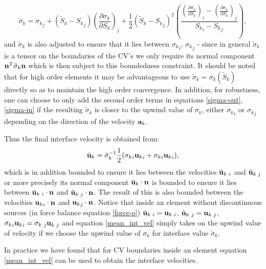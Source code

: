 \begin{equation}
\tilde\sigma_k =  {\sigma_k}_j + (\tilde S_k - {S_k}_j) \left(\frac{\partial\sigma_k}{\partial S_k}\right)_j 
+\frac{1}{2} (\tilde S_k - {S_k}_j)^2   
\left(  \frac{  \left(\frac{\partial\sigma_k}{\partial S_k}\right)_i - \left(\frac{\partial\sigma_k}{\partial S_k}\right)_j  }  
{{S_k}_i - {S_k}_j} \right), 
\label{sigma-in}
\end{equation} 
and $\tilde\sigma_k$ is also adjusted to ensure that it lies between ${\sigma_k}_i$, ${\sigma_k}_j$ - since 
in general $\tilde\sigma_k$ is a tensor on the boundaries of the CV's we only require its 
normal component ${\bf n}^T\tilde\sigma_k {\bf n}$ which is then subject to this boundedness constraint. 
It should be noted that for high order elements it may be advantageous to use $\tilde\sigma_k = \sigma_k (\tilde S_k)$ 
directly so as to maintain the high order convergence. In addition, for robustness, one can 
choose to only add the second order terms in equations  \ref{sigma-out}, \ref{sigma-in} if the resulting 
$\tilde\sigma_k $ is closer to the upwind value of $\sigma_k$, either ${\sigma_k}_i$ or ${\sigma_k}_j$ 
depending on the direction of the velocity ${\bf a}_k$. 

Thus the final interface velocity is obtained from:
\begin{equation}
{\tilde{\bf u}_k} = {\tilde\sigma_k}^{-1}  \frac{1}{2} ( {\sigma_k}_i {{\bf u}_k}_i + {\sigma_k}_i {{\bf u}_k}_i ), 
\label{mean_int_vel}  
\end{equation} 
which is in addition bounded to ensure it lies between the velocities ${\tilde{\bf u}_k}\:_i$ and ${\tilde{\bf u}_k}\:_j$ 
or more precisely its normal component ${\tilde{\bf u}_k}\cdot {\bf n}$ is bounded to ensure it lies between 
${\tilde{\bf u}_k}\:_i\cdot {\bf n}$ and ${\tilde{\bf{u}}_k}\:_j\cdot {\bf n}$. 
The result of this is also bounded between the velocities 
${{\bf u}_k}_i\cdot {\bf n}$ and ${{\bf u}_k}_j\cdot {\bf n}$. 
Notice that inside an element without discontinuous sources (in force balance equation \ref{force-o}) ${\tilde{\bf u}_k}\:_i={{\bf u}_k}\:_i$, ${\tilde{\bf u}_k}\:_j={{\bf u}_k}\:_j$, 
${\sigma_k}_i {{\bf u}_k}_i = {\sigma_k}\:_j {{\bf u}_k}\:_j $ and 
equation \ref{mean_int_vel} simply takes on the upwind value of velocity if we choose the upwind value of $\sigma_k$ for 
interface value $\tilde\sigma_k$.

In practice we have found that for CV boundaries inside an element equation \ref{mean_int_vel} 
can be used to obtain the interface velocities. 

